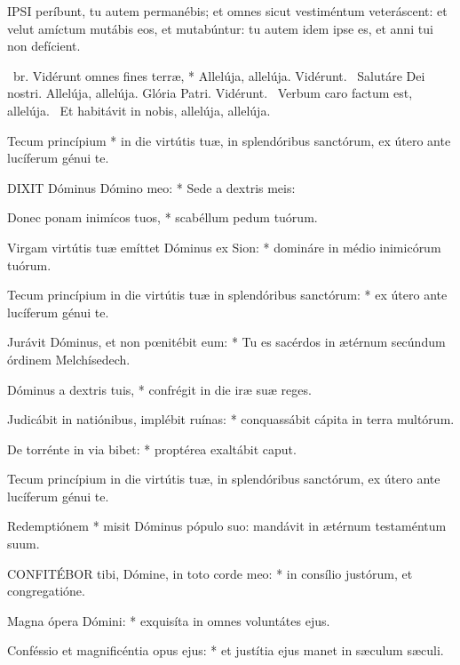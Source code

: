 

\lettrine[lines=2]{I}{PSI} períbunt, tu autem permanébis; et omnes sicut vestiméntum veteráscent: et velut amíctum mutábis eos, et mutabúntur: tu autem idem ipse es, et anni tui non defícient.

\R\ br. Vidérunt omnes fines terræ, * Allelúja, allelúja. Vidérunt. \V\ Salutáre Dei nostri. Allelúja, allelúja. Glória Patri. Vidérunt. \V\ Verbum caro factum est, allelúja. \R\ Et habitávit in nobis, allelúja, allelúja.


 Tecum princípium * in die virtútis tuæ, in splendóribus sanctórum, ex útero ante lucíferum génui te.


\lettrine[lines=2]{D}{IXIT} Dóminus Dómino meo: * Sede a dextris meis:

Donec ponam inimícos tuos, * scabéllum pedum tuórum.

Virgam virtútis tuæ emíttet Dóminus ex Sion: * domináre in médio inimicórum tuórum.

Tecum princípium in die virtútis tuæ in splendóribus sanctórum: * ex útero ante lucíferum génui te.

Jurávit Dóminus, et non pœnitébit eum: * Tu es sacérdos in ætérnum secúndum órdinem Melchísedech.

Dóminus a dextris tuis, * confrégit in die iræ suæ reges.

Judicábit in natiónibus, implébit ruínas: * conquassábit cápita in terra multórum.

De torrénte in via bibet: * proptérea exaltábit caput.

 Tecum princípium in die virtútis tuæ, in splendóribus sanctórum, ex útero ante lucíferum génui te.

 Redemptiónem * misit Dóminus pópulo suo: mandávit in ætérnum testaméntum suum.


\lettrine[lines=2]{C}{ONFITÉBOR} tibi, Dómine, in toto corde meo: * in consílio justórum, et congregatióne.

Magna ópera Dómini: * exquisíta in omnes voluntátes ejus.

Conféssio et magnificéntia opus ejus: * et justítia ejus manet in sæculum sæculi.

